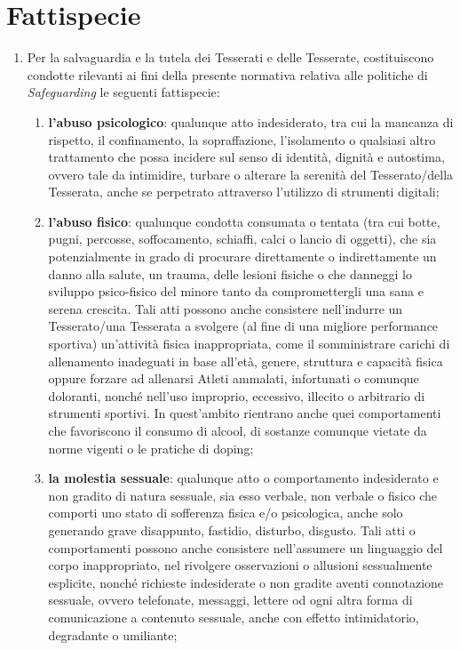 \documentclass{djtsasddoc}
\begin{document}
	\section{Fattispecie}
	\begin{enumerate}
		\item Per la salvaguardia e la tutela dei Tesserati e delle Tesserate, costituiscono condotte rilevanti ai fini della presente normativa relativa alle politiche di \textit{Safeguarding} le seguenti fattispecie:
		\begin{enumerate}
			\item \textbf{l'abuso psicologico}: qualunque atto indesiderato, tra cui la mancanza di rispetto, il	confinamento, la sopraffazione, l'isolamento o qualsiasi altro trattamento che possa incidere	sul senso di identità, dignità e autostima, ovvero tale da intimidire, turbare o alterare la serenità del Tesserato/della Tesserata, anche se perpetrato attraverso l'utilizzo di strumenti digitali;
			\item \textbf{l'abuso fisico}: qualunque condotta consumata o tentata (tra cui botte, pugni, percosse, soffocamento, schiaffi, calci o lancio di oggetti), che sia potenzialmente in grado di procurare 	direttamente o indirettamente un danno alla salute, un trauma, delle lesioni fisiche o che	danneggi lo sviluppo psico-fisico del minore tanto da compromettergli una sana e serena crescita. Tali atti possono anche consistere nell'indurre un Tesserato/una Tesserata a svolgere (al fine di una migliore performance sportiva) un'attività fisica inappropriata, come il somministrare carichi di allenamento inadeguati in base all'età, genere, struttura e capacità fisica oppure forzare ad allenarsi Atleti ammalati, infortunati o comunque doloranti, nonché nell'uso improprio, eccessivo, illecito o arbitrario di strumenti sportivi. In quest'ambito rientrano anche quei comportamenti che favoriscono il consumo di alcool, di sostanze comunque vietate da norme vigenti o le pratiche di doping;
			\item \textbf{la molestia sessuale}: qualunque atto o comportamento indesiderato e non gradito di natura sessuale, sia esso verbale, non verbale o fisico che comporti uno stato di sofferenza fisica e/o psicologica, anche solo generando grave disappunto, fastidio, disturbo, disgusto. Tali atti o	comportamenti possono anche consistere nell'assumere un linguaggio del corpo inappropriato, nel rivolgere osservazioni o allusioni sessualmente esplicite, nonché richieste indesiderate o non gradite aventi connotazione sessuale, ovvero telefonate, messaggi, lettere od ogni altra forma di comunicazione a contenuto sessuale, anche con effetto intimidatorio, degradante o umiliante;

\end{enumerate}
\end{enumerate}
\end{document}
